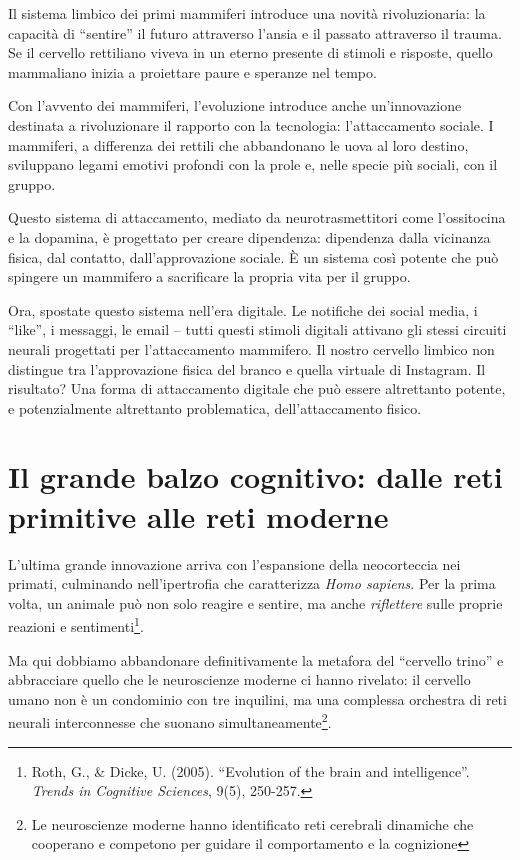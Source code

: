 Il sistema limbico dei primi mammiferi introduce una novità rivoluzionaria: la capacità di ``sentire'' il futuro attraverso l'ansia e il passato attraverso il trauma. Se il cervello rettiliano viveva in un eterno presente di stimoli e risposte, quello mammaliano inizia a proiettare paure e speranze nel tempo.

Con l'avvento dei mammiferi, l'evoluzione introduce anche un'innovazione destinata a rivoluzionare il rapporto con la tecnologia: l'attaccamento sociale. I mammiferi, a differenza dei rettili che abbandonano le uova al loro destino, sviluppano legami emotivi profondi con la prole e, nelle specie più sociali, con il gruppo.

Questo sistema di attaccamento, mediato da neurotrasmettitori come l'ossitocina e la dopamina, è progettato per creare dipendenza: dipendenza dalla vicinanza fisica, dal contatto, dall'approvazione sociale. È un sistema così potente che può spingere un mammifero a sacrificare la propria vita per il gruppo.

Ora, spostate questo sistema nell'era digitale. Le notifiche dei social media, i ``like'', i messaggi, le email – tutti questi stimoli digitali attivano gli stessi circuiti neurali progettati per l'attaccamento mammifero. Il nostro cervello limbico non distingue tra l'approvazione fisica del branco e quella virtuale di Instagram. Il risultato? Una forma di attaccamento digitale che può essere altrettanto potente, e potenzialmente altrettanto problematica, dell'attaccamento fisico.

\section{Il grande balzo cognitivo: dalle reti primitive alle reti moderne}

L'ultima grande innovazione arriva con l'espansione della neocorteccia nei primati, culminando nell'ipertrofia che caratterizza \textit{Homo sapiens}. Per la prima volta, un animale può non solo reagire e sentire, ma anche \textit{riflettere} sulle proprie reazioni e sentimenti\footnote{Roth, G., \& Dicke, U. (2005). ``Evolution of the brain and intelligence''. \textit{Trends in Cognitive Sciences}, 9(5), 250-257.}.

Ma qui dobbiamo abbandonare definitivamente la metafora del ``cervello trino'' e abbracciare quello che le neuroscienze moderne ci hanno rivelato: il cervello umano non è un condominio con tre inquilini, ma una complessa orchestra di reti neurali interconnesse che suonano simultaneamente\footnote{Le neuroscienze moderne hanno identificato reti cerebrali dinamiche che cooperano e competono per guidare il comportamento e la cognizione}.

